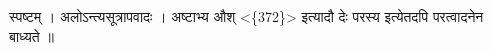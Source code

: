स्पष्टम् । अलोऽन्त्यसूत्रापवादः । अष्टाभ्य औश्
\textless{}\{372\}\textgreater{} इत्यादौ देः परस्य इत्येतदपि परत्वादनेन
बाध्यते ॥
